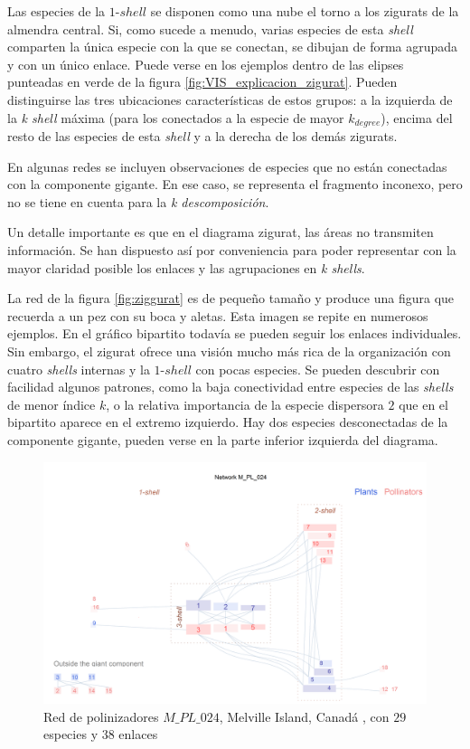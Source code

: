 Las especies de la $1$-$shell$ se disponen como una nube el torno a los zigurats de la almendra central. Si, como sucede a menudo, varias especies de esta \textit{shell} comparten la única especie con la que se conectan, se dibujan de forma agrupada y con un único enlace. Puede verse en los ejemplos dentro de las elipses punteadas en verde de la figura \ref{fig:VIS_explicacion_zigurat}. Pueden distinguirse las tres ubicaciones características de estos grupos: a la izquierda de la \textit{k shell} máxima (para los conectados a la especie de mayor $k_{degree}$), encima del resto de las especies de esta \textit{shell} y a la derecha de los demás zigurats.


En algunas redes se incluyen observaciones de especies que no están conectadas con la componente gigante. En ese caso, se representa el fragmento inconexo, pero no se tiene en cuenta para la \textit{k descomposición}.

Un detalle importante es que en el diagrama zigurat, las áreas no transmiten información. Se han dispuesto así por conveniencia para poder representar con la mayor claridad posible los enlaces y las agrupaciones en \textit{k shells}.

La red de la figura \ref{fig:ziggurat} es de pequeño tamaño y produce una figura que recuerda a un pez con su boca y aletas. Esta imagen se repite en numerosos ejemplos. En el gráfico bipartito todavía se pueden seguir los enlaces individuales. Sin embargo, el zigurat ofrece una visión mucho más rica de la organización con cuatro \textit{shells} internas y la $1$-$shell$ con pocas especies. Se pueden descubrir con facilidad algunos patrones, como la baja conectividad entre especies de las \textit{shells} de menor índice $k$, o la relativa importancia de la especie dispersora $2$ que en el bipartito aparece en el extremo izquierdo. Hay dos especies desconectadas de la componente gigante, pueden verse en la parte inferior izquierda del diagrama.

\begin{figure}[hp!]
\centering
\includegraphics[scale=0.45]{Figures/VIS_M_PL_024_ziggurat.png}
\caption {Red de polinizadores $M\_PL\_024$, Melville Island, Canadá \cite{mosquin1967observations}, con $29$ especies y $38$ enlaces}
\label{fig:VIS_zig_pl_024}
\end{figure}

